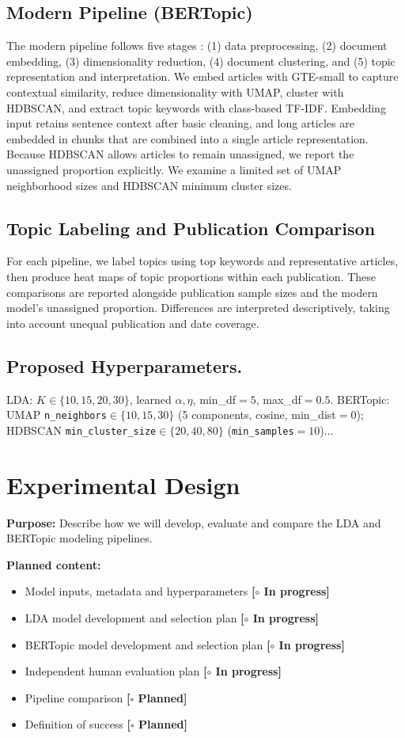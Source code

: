 \documentclass[conference]{IEEEtran}
\newcommand{\wip}{\textcolor{orange!70!black}{\textbf{[$\circ$ In progress]}}}
\newcommand{\planned}{\textcolor{blue!60!black}{\textbf{[$\square$ Planned]}}}
\begin{document}
\subsection*{Modern Pipeline (BERTopic)}
The modern pipeline follows five stages \cite{alammar2024, kumari2026}: (1) data preprocessing, (2) document embedding, (3) dimensionality reduction, (4) document clustering, and (5) topic representation and interpretation. We embed articles with GTE-small to capture contextual similarity, reduce dimensionality with UMAP, cluster with HDBSCAN, and extract topic keywords with class-based TF-IDF. Embedding input retains sentence context after basic cleaning, and long articles are embedded in chunks that are combined into a single article representation. Because HDBSCAN allows articles to remain unassigned, we report the unassigned proportion explicitly. We examine a limited set of UMAP neighborhood sizes and HDBSCAN minimum cluster sizes.

\subsection*{Topic Labeling and Publication Comparison}
For each pipeline, we label topics using top keywords and representative articles, then produce heat maps of topic proportions within each publication. These comparisons are reported alongside publication sample sizes and the modern model's unassigned proportion. Differences are interpreted descriptively, taking into account unequal publication and date coverage.

\subsection*{Proposed Hyperparameters.} LDA: $K\in\{10,15,20,30\}$, learned $\alpha,\eta$,
min\_df$=5$, max\_df$=0.5$. BERTopic: UMAP \texttt{n\_neighbors}$\in\{10,15,30\}$
(5 components, cosine, min\_dist$=0$); HDBSCAN \texttt{min\_cluster\_size}$\in\{20,40,80\}$
(\texttt{min\_samples}$=10$)...

\section*{Experimental Design}
\textbf{Purpose:} Describe how we will develop, evaluate and compare the LDA and BERTopic modeling pipelines.

\textbf{Planned content:} 
\begin{itemize}
    \item Model inputs, metadata and hyperparameters \wip
    \item  LDA model development and selection plan \wip
    \item  BERTopic model development and selection plan \wip
    \item Independent human evaluation plan \wip
    \item Pipeline comparison \planned
    \item Definition of success \planned
\end{itemize}
\end{document}
